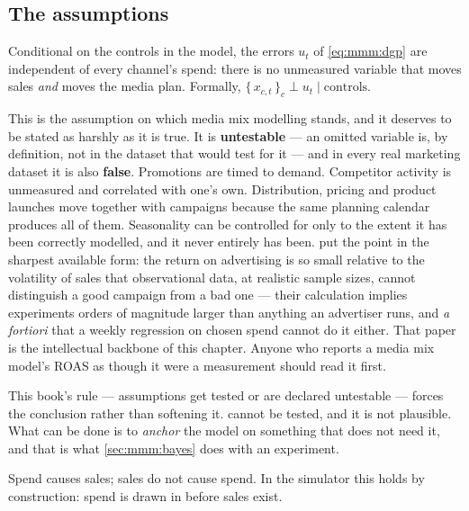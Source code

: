 \subsection*{The assumptions}

\begin{assumption}\label{as:mmm:noconf}
Conditional on the controls in the model, the errors $u_t$ of \cref{eq:mmm:dgp} are independent of
every channel's spend: there is no unmeasured variable that moves sales \emph{and} moves the media
plan. Formally, $\{\,x_{c,t}\,\}_{c} \perp u_t \mid \text{controls}$.
\end{assumption}

This is the assumption on which media mix modelling stands, and it deserves to be stated as
harshly as it is true. It is \textbf{untestable} --- an omitted variable is, by definition, not in
the dataset that would test for it --- and in every real marketing dataset it is also
\textbf{false}. Promotions are timed to demand. Competitor activity is unmeasured and correlated
with one's own. Distribution, pricing and product launches move together with campaigns because
the same planning calendar produces all of them. Seasonality can be controlled for only to the
extent it has been correctly modelled, and it never entirely has been.  put the
point in the sharpest available form: the return on advertising is so small relative to the
volatility of sales that observational data, at realistic sample sizes, cannot distinguish a good
campaign from a bad one --- their calculation implies experiments orders of magnitude larger than
anything an advertiser runs, and \emph{a fortiori} that a weekly regression on chosen spend cannot
do it either. That paper is the intellectual backbone of this chapter. Anyone who reports a media
mix model's ROAS as though it were a measurement should read it first.

This book's rule --- assumptions get tested or are declared untestable --- forces the conclusion
rather than softening it.  cannot be tested, and it is not plausible. What can
be done is to \emph{anchor} the model on something that does not need it, and that is what
\cref{sec:mmm:bayes} does with an experiment.

\begin{assumption}\label{as:mmm:noreverse}
Spend causes sales; sales do not cause spend. In the simulator this holds by construction: spend is
drawn in  before sales exist.
\end{assumption}

